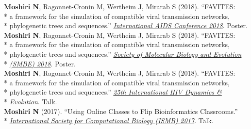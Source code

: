 \documentclass[margin,line]{res}
\begin{document}
\begin{resume}
\hspace*{4mm} \textbf{Moshiri N}, Ragonnet-Cronin M, Wertheim J, Mirarab S (2018). ``FAVITES:\\*
\hspace*{9.5mm} a framework for the simulation of compatible viral transmission networks,\\*\vspace{2mm}
\hspace*{8.5mm} phylogenetic trees and sequences.'' \href{https://www.aids2018.org/}{\textit{International AIDS Conference 2018}}. Poster.\\
\hspace*{4mm} \textbf{Moshiri N}, Ragonnet-Cronin M, Wertheim J, Mirarab S (2018). ``FAVITES:\\*
\hspace*{9.5mm} a framework for the simulation of compatible viral transmission networks,\\*
\hspace*{9.5mm} phylogenetic trees and sequences.'' \href{https://smbe.org/smbe/SMBE2018Meeting/}{\textit{Society of Molecular Biology and Evolution}}\\*\vspace{2mm}
\hspace*{8mm} \href{https://smbe.org/smbe/SMBE2018Meeting/}{\textit{(SMBE) 2018}}. Poster.\\
\hspace*{4mm} \textbf{Moshiri N}, Ragonnet-Cronin M, Wertheim J, Mirarab S (2018). ``FAVITES:\\*
\hspace*{9.5mm} a framework for the simulation of compatible viral transmission networks,\\*
\hspace*{9.5mm} phylogenetic trees and sequences.'' \href{https://cme.ucsd.edu/hivdynamics/}{\textit{25th International HIV Dynamics \&}}\\*\vspace{2mm}
\hspace*{8mm} \href{https://cme.ucsd.edu/hivdynamics/}{\textit{Evolution}}. Talk.\\
\hspace*{4mm} \textbf{Moshiri N} (2017). ``Using Online Classes to Flip Bioinformatics Classrooms.''\\*\vspace{2mm}
\hspace*{8mm} \href{https://www.iscb.org/cms_addon/conferences/ismbeccb2017/technologytrack.php}{\textit{International Society for Computational Biology (ISMB) 2017}}. Talk.\\

\end{resume}
\end{document}
